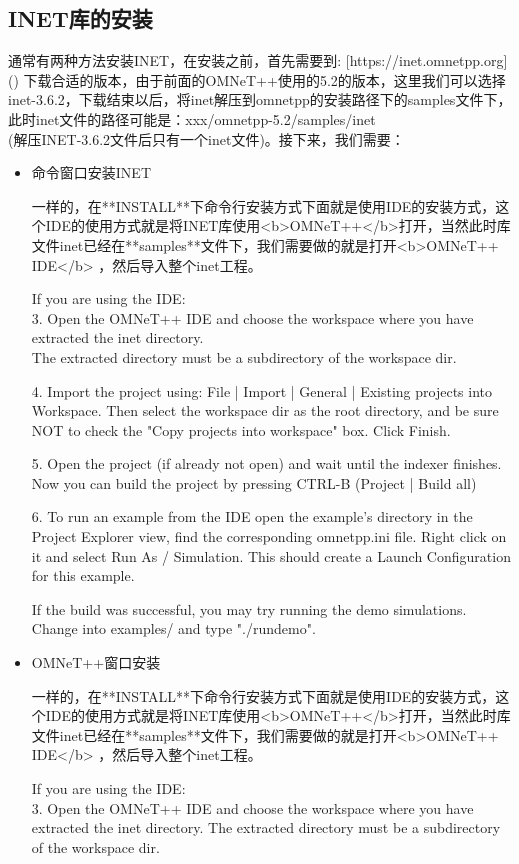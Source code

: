 \subsection{INET库的安装}
通常有两种方法安装INET，在安装之前，首先需要到:
[https://inet.omnetpp.org]()
下载合适的版本，由于前面的OMNeT++使用的5.2的版本，这里我们可以选择inet-3.6.2，下载结束以后，将inet解压到omnetpp的安装路径下的samples文件下，此时inet文件的路径可能是：xxx/omnetpp-5.2/samples/inet\\
(解压INET-3.6.2文件后只有一个inet文件)。接下来，我们需要：

\begin{itemize}
	\item 命令窗口安装INET
	
一样的，在**INSTALL**下命令行安装方式下面就是使用IDE的安装方式，这个IDE的使用方式就是将INET库使用<b>OMNeT++</b>打开，当然此时库文件inet已经在**samples**文件下，我们需要做的就是打开<b>OMNeT++ IDE</b> ，然后导入整个inet工程。
		
\begin{definition}
If you are using the IDE:\\
3. Open the OMNeT++ IDE and choose the workspace where you have extracted the inet directory.\\
The extracted directory must be a subdirectory of the workspace dir.

4. Import the project using: File | Import | General | Existing projects into Workspace.
Then select the workspace dir as the root directory, and be sure NOT to check the
"Copy projects into workspace" box. Click Finish.

5. Open the project (if already not open) and wait until the indexer finishes.
Now you can build the project by pressing CTRL-B (Project | Build all)

6. To run an example from the IDE open the example's directory in the Project Explorer view,
find the corresponding omnetpp.ini file. Right click on it and select Run As / Simulation.
This should create a Launch Configuration for this example.

If the build was successful, you may try running the demo simulations.
Change into examples/ and type "./rundemo".
\end{definition}
			
	\item OMNeT++窗口安装	
	
一样的，在**INSTALL**下命令行安装方式下面就是使用IDE的安装方式，这个IDE的使用方式就是将INET库使用<b>OMNeT++</b>打开，当然此时库文件inet已经在**samples**文件下，我们需要做的就是打开<b>OMNeT++ IDE</b> ，然后导入整个inet工程。
\begin{definition}
	If you are using the IDE:\\
	3. Open the OMNeT++ IDE and choose the workspace where you have extracted the inet directory.
	The extracted directory must be a subdirectory of the workspace dir.
	

\end{definition}
\end{itemize}
